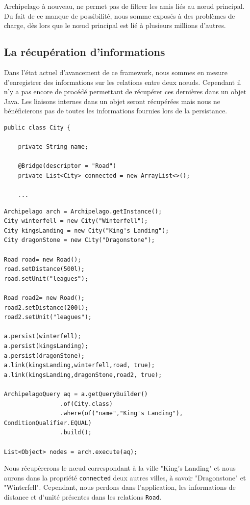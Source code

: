\documentclass[a4paper,fleqn,12pt]{report}
\begin{document}
Archipelago à nouveau, ne permet pas de filtrer les amis liés au nœud principal. Du fait de ce manque de possibilité, nous somme exposés à des problèmes de charge, dès lors que le nœud principal est lié à plusieurs millions d'autres.

\subsection{La récupération d'informations}

Dans l'état actuel d'avancement de ce framework, nous sommes en mesure d'enregistrer des informations sur les relations entre deux nœuds. Cependant il n'y a pas encore de procédé permettant de récupérer ces dernières dans un objet Java. Les  liaisons internes dans un objet seront récupérées mais nous ne bénéficierons pas de toutes les informations fournies lors de la persistance.

\begin{lstlisting}
public class City {

    private String name;

    @Bridge(descriptor = "Road")
    private List<City> connected = new ArrayList<>();
	
	...
\end{lstlisting}

\begin{lstlisting}
Archipelago arch = Archipelago.getInstance();
City winterfell = new City("Winterfell");
City kingsLanding = new City("King's Landing");
City dragonStone = new City("Dragonstone");

Road road= new Road();
road.setDistance(500l);
road.setUnit("leagues");

Road road2= new Road();
road2.setDistance(200l);
road2.setUnit("leagues");

a.persist(winterfell);
a.persist(kingsLanding);
a.persist(dragonStone);
a.link(kingsLanding,winterfell,road, true);
a.link(kingsLanding,dragonStone,road2, true);

ArchipelagoQuery aq = a.getQueryBuilder()
                .of(City.class)
                .where(of("name","King's Landing"), ConditionQualifier.EQUAL)
                .build();
                
List<Object> nodes = arch.execute(aq);
\end{lstlisting}

Nous récupèrerons le nœud correspondant à la ville "King's Landing" et nous aurons dans la propriété \texttt{connected} deux autres villes, à savoir "Dragonstone" et "Winterfell". Cependant, nous perdons dans l'application, les informations de distance et d'unité présentes dans les relations \texttt{Road}.
\end{document}
